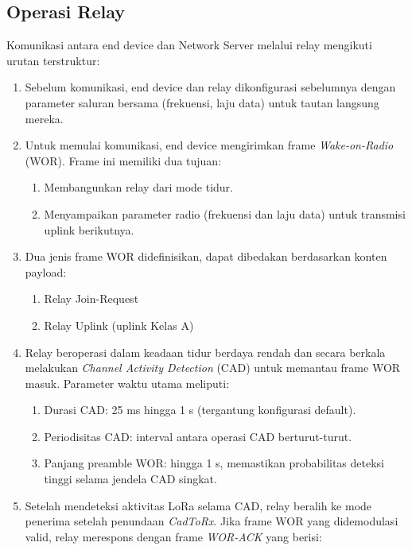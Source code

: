 \subsection{Operasi Relay}
Komunikasi antara end device dan Network Server melalui relay mengikuti urutan terstruktur:
\begin{enumerate}
    \item Sebelum komunikasi, end device dan relay dikonfigurasi sebelumnya dengan parameter saluran bersama (frekuensi, laju data) untuk tautan langsung mereka.
    \item Untuk memulai komunikasi, end device mengirimkan frame \emph{Wake-on-Radio} (WOR). Frame ini memiliki dua tujuan:
          \begin{enumerate}
              \item Membangunkan relay dari mode tidur.
              \item Menyampaikan parameter radio (frekuensi dan laju data) untuk transmisi uplink berikutnya.
          \end{enumerate}
    \item Dua jenis frame WOR didefinisikan, dapat dibedakan berdasarkan konten payload:
          \begin{enumerate}
              \item Relay Join-Request
              \item Relay Uplink (uplink Kelas A)
          \end{enumerate}
    \item Relay beroperasi dalam keadaan tidur berdaya rendah dan secara berkala melakukan \emph{Channel Activity Detection} (CAD) untuk memantau frame WOR masuk. Parameter waktu utama meliputi:
          \begin{enumerate}
              \item Durasi CAD: 25 ms hingga 1 s (tergantung konfigurasi default).
              \item Periodisitas CAD: interval antara operasi CAD berturut-turut.
              \item Panjang preamble WOR: hingga 1 s, memastikan probabilitas deteksi tinggi selama jendela CAD singkat.
          \end{enumerate}
    \item Setelah mendeteksi aktivitas LoRa selama CAD, relay beralih ke mode penerima setelah penundaan \emph{CadToRx}. Jika frame WOR yang didemodulasi valid, relay merespons dengan frame \emph{WOR-ACK} yang berisi:
          \begin{enumerate}

\end{enumerate}
\end{enumerate}

